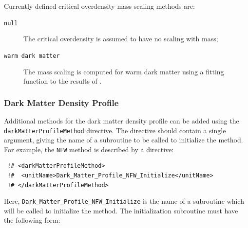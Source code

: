 Currently defined critical overdensity mass scaling methods are:
\begin{description}
 \item [{\tt null}] The critical overdensity is assumed to have no scaling with mass;
 \item [{\tt warm dark matter}] The mass scaling is computed for warm dark matter using a fitting function to the results of \cite{barkana_constraints_2001}.
\end{description}

\subsubsection{Dark Matter Density Profile}

Additional methods for the dark matter density profile can be added using the {\tt darkMatterProfileMethod} directive. The directive should contain a single argument, giving the name of a subroutine to be called to initialize the method. For example, the {\tt NFW} method is described by a directive:
\begin{verbatim}
 !# <darkMatterProfileMethod>
 !#  <unitName>Dark_Matter_Profile_NFW_Initialize</unitName>
 !# </darkMatterProfileMethod>
\end{verbatim}
Here, {\tt Dark\_Matter\_Profile\_NFW\_Initialize} is the name of a subroutine which will be called to initialize the method. The initialization subroutine must have the following form:
